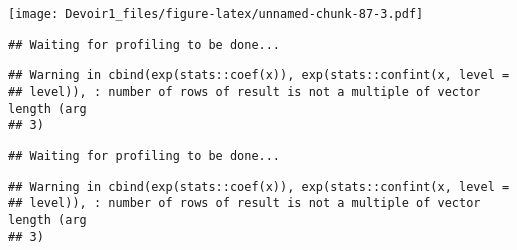 \documentclass[]{article}
\newenvironment{Shaded}{\begin{snugshade}}{\end{snugshade}}
\newcommand{\KeywordTok}[1]{\textcolor[rgb]{0.13,0.29,0.53}{\textbf{#1}}}
\newcommand{\DataTypeTok}[1]{\textcolor[rgb]{0.13,0.29,0.53}{#1}}
\newcommand{\DecValTok}[1]{\textcolor[rgb]{0.00,0.00,0.81}{#1}}
\newcommand{\StringTok}[1]{\textcolor[rgb]{0.31,0.60,0.02}{#1}}
\newcommand{\OperatorTok}[1]{\textcolor[rgb]{0.81,0.36,0.00}{\textbf{#1}}}
\newcommand{\NormalTok}[1]{#1}
\begin{document}
\texttt{[image: Devoir1\_files/figure-latex/unnamed-chunk-87-3.pdf]}

\begin{Shaded}
\end{Shaded}

\begin{verbatim}
## Waiting for profiling to be done...
\end{verbatim}

\begin{verbatim}
## Warning in cbind(exp(stats::coef(x)), exp(stats::confint(x, level =
## level)), : number of rows of result is not a multiple of vector length (arg
## 3)
\end{verbatim}

\begin{verbatim}
## Waiting for profiling to be done...
\end{verbatim}

\begin{verbatim}
## Warning in cbind(exp(stats::coef(x)), exp(stats::confint(x, level =
## level)), : number of rows of result is not a multiple of vector length (arg
## 3)
\end{verbatim}
\end{document}
